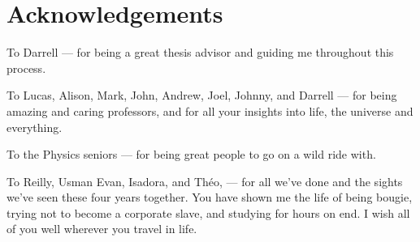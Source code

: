 \chapter*{Acknowledgements} %

To Darrell --- for being a great thesis advisor and guiding me throughout this
process.

To Lucas, Alison, Mark, John, Andrew, Joel, Johnny, and Darrell --- for being
amazing and caring professors, and for all your insights into life, the universe
and everything.

To the Physics seniors --- for being great people to go on a wild ride with.

\newcommand{\gr}[1]{\textcolor{black!66.67}{#1}}

\gr{T}o
\gr{R}eilly,
\gr{U}sman
\gr{E}van,
\gr{I}sadora,
and
\gr{T}h\'eo,
---
for all \gr{w}e've done \gr{a}nd the \gr{s}ights we've \gr{s}een t\gr{h}ese
f\gr{o}u\gr{r} years \gr{t}ogether. You have shown me the life of \gr{b}eing
bo\gr{u}gie, \gr{t}rying not to become \gr{a} corporate s\gr{la}ve, and
\gr{st}udy\gr{ing} for hour\gr{s} \gr{o}n end. I wish all of you well
whe\gr{r}ever you \gr{t}ravel in life.

